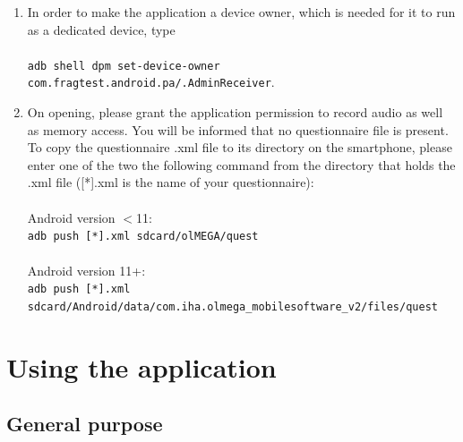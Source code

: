 \documentclass[11pt,a4paper,titlepage]{article}
\begin{document}
\begin{enumerate}
	\item In order to make the application a device owner, which is needed for it to run as a dedicated device, type\\
	\\
	\colorbox{black!10}{\texttt{adb shell dpm set-device-owner com.fragtest.android.pa/.AdminReceiver}}.\\
	
	\item On opening, please grant the application permission to record audio as well as memory access. You will be informed that no questionnaire file is present. To copy the questionnaire .xml file to its directory on the smartphone, please enter one of the two the following command from the directory that holds the .xml file ([*].xml is the name of your questionnaire):\\
	\\
	Android version $<$11:\\
	\colorbox{black!10}{\texttt{adb push [*].xml sdcard/olMEGA/quest}}\\
	\\
	Android version 11+:\\
	\colorbox{black!10}{\texttt{adb push [*].xml sdcard/Android/data/com.iha.olmega\_mobilesoftware\_v2/files/quest}}\\
	
\end{enumerate}

\newpage

\section{Using the application}\label{sec_usage}


\subsection{General purpose}
\end{document}
